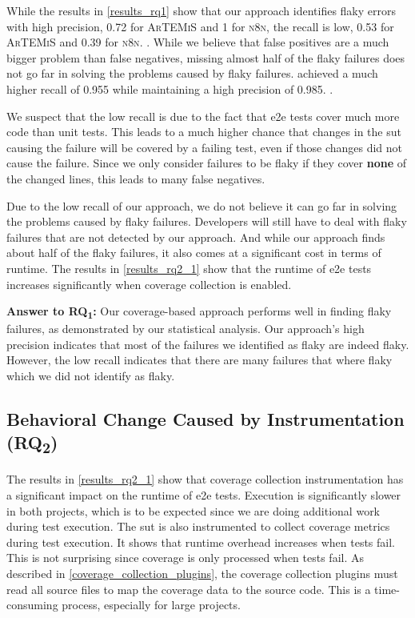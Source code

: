 While the results in \cref{results_rq1} show that our approach identifies flaky errors with high precision, \num{0.72} for \textsc{ArTEMiS} and \num{1} for \textsc{n8n}, the recall is low, \num{0.53} for \textsc{ArTEMiS} and \num{0.39} for \textsc{n8n}. .
While we believe that false positives are a much bigger problem than false negatives, missing almost half of the flaky failures does not go far in solving the problems caused by flaky failures.
 achieved a much higher recall of \num{0.955} while maintaining a high precision of \num{0.985}. \cite{bell_deflaker_2018}.

We suspect that the low recall is due to the fact that \ac{e2e} tests cover much more code than unit tests.
This leads to a much higher chance that changes in the \ac{sut} causing the failure will be covered by a failing test, even if those changes did not cause the failure.
Since we only consider failures to be flaky if they cover \textbf{none} of the changed lines, this leads to many false negatives.

Due to the low recall of our approach, we do not believe it can go far in solving the problems caused by flaky failures.
Developers will still have to deal with flaky failures that are not detected by our approach.
And while our approach finds about half of the flaky failures, it also comes at a significant cost in terms of runtime.
The results in \cref{results_rq2_1} show that the runtime of \ac{e2e} tests increases significantly when coverage collection is enabled.

\begin{mdframed}
	\textbf{Answer to RQ\textsubscript{1}:} Our coverage-based approach performs well in finding flaky failures, as demonstrated by our statistical analysis.
	Our approach's high precision indicates that most of the failures we identified as flaky are indeed flaky.
	However, the low recall indicates that there are many failures that where flaky which we did not identify as flaky.
\end{mdframed}

\subsection{Behavioral Change Caused by Instrumentation (\texorpdfstring{RQ\textsubscript{2}}{RQ2})}

The results in \cref{results_rq2_1} show that coverage collection instrumentation has a significant impact on the runtime of \ac{e2e} tests.
Execution is significantly slower in both projects, which is to be expected since we are doing additional work during test execution.
The \ac{sut} is also instrumented to collect coverage metrics during test execution.
It shows that runtime overhead increases when tests fail.
This is not surprising since coverage is only processed when tests fail.
As described in \cref{coverage_collection_plugins}, the coverage collection plugins must read all source files to map the coverage data to the source code.
This is a time-consuming process, especially for large projects.

